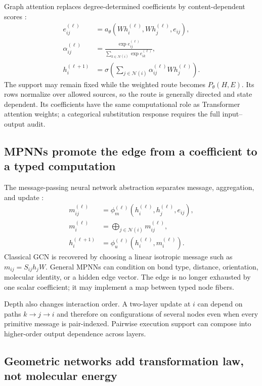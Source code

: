 Graph attention replaces degree-determined coefficients by content-dependent scores
\cite{velickovic2018}:
\begin{align}
e_{ij}^{(\ell)}
&=a_\theta\!\left(W h_i^{(\ell)},Wh_j^{(\ell)},e_{ij}\right),\nonumber\\
\alpha_{ij}^{(\ell)}
&=\frac{\exp e_{ij}^{(\ell)}}
{\sum_{k\in\mathcal N(i)}\exp e_{ik}^{(\ell)}},\nonumber\\
h_i^{(\ell+1)}
&=\sigma\!\left(\sum_{j\in\mathcal N(i)}
\alpha_{ij}^{(\ell)}Wh_j^{(\ell)}\right).
\label{eq:book-gcn-gat}
\end{align}
The support may remain fixed while the weighted route becomes $P_\theta(H,E)$.  Its rows normalize
over allowed sources, so the route is generally directed and state dependent.  Its coefficients
have the same computational role as Transformer attention weights; a categorical substitution
response requires the full input--output audit.

\subsection{MPNNs promote the edge from a coefficient to a typed computation}

The message-passing neural network abstraction separates message, aggregation, and update
\cite{gilmer2017,battaglia2018relational}:
\begin{align}
m_{ij}^{(\ell)}
&=\phi_m^{(\ell)}
\left(h_i^{(\ell)},h_j^{(\ell)},e_{ij}\right),\nonumber\\
m_i^{(\ell)}
&=\bigoplus_{j\in\mathcal N(i)}m_{ij}^{(\ell)},\nonumber\\
h_i^{(\ell+1)}
&=\phi_u^{(\ell)}\left(h_i^{(\ell)},m_i^{(\ell)}\right).
\label{eq:book-gcn-mpnn}
\end{align}
Classical GCN is recovered by choosing a linear isotropic message such as
$m_{ij}=S_{ij}h_jW$.  General MPNNs can condition on bond type, distance, orientation, molecular
identity, or a hidden edge vector.  The edge is no longer exhausted by one scalar coefficient; it
may implement a map between typed node fibers.

Depth also changes interaction order.  A two-layer update at $i$ can depend on paths $k\to j\to i$
and therefore on configurations of several nodes even when every primitive message is pair-indexed.
Pairwise execution support can compose into higher-order output dependence across layers.

\subsection{Geometric networks add transformation law, not molecular energy}

